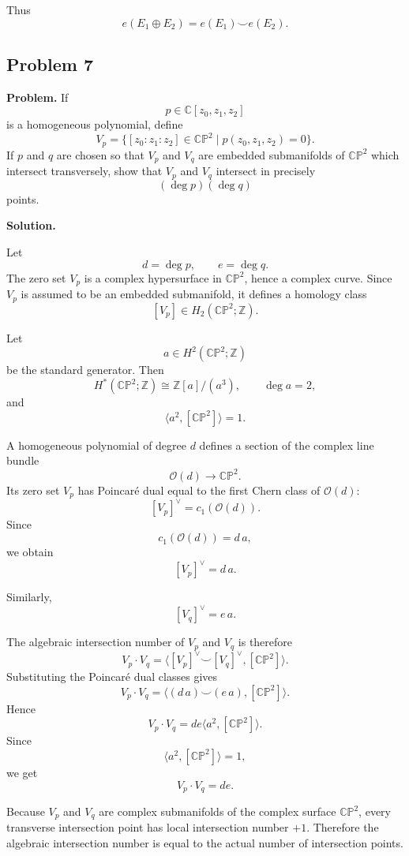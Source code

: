 \documentclass[12pt,a4paper]{article}
\theoremstyle{notespace}
\begin{document}
Thus
\[
\boxed{
	e(E_1\oplus E_2)=e(E_1)\smile e(E_2).
}
\]

\subsection{Problem 7}

\textbf{Problem.}
If
\[
p\in \mathbb C[z_0,z_1,z_2]
\]
is a homogeneous polynomial, define
\[
V_p
=
\{[z_0:z_1:z_2]\in \mathbb{CP}^2
\mid
p(z_0,z_1,z_2)=0\}.
\]
If \(p\) and \(q\) are chosen so that \(V_p\) and \(V_q\) are embedded
submanifolds of \(\mathbb{CP}^2\) which intersect transversely, show that
\(V_p\) and \(V_q\) intersect in precisely
\[
(\deg p)(\deg q)
\]
points.

\medskip

\noindent\textbf{Solution.}

Let
\[
d=\deg p,
\qquad
e=\deg q.
\]
The zero set \(V_p\) is a complex hypersurface in \(\mathbb{CP}^2\), hence a
complex curve. Since \(V_p\) is assumed to be an embedded submanifold, it defines
a homology class
\[
[V_p]\in H_2(\mathbb{CP}^2;\mathbb Z).
\]

Let
\[
a\in H^2(\mathbb{CP}^2;\mathbb Z)
\]
be the standard generator. Then
\[
H^*(\mathbb{CP}^2;\mathbb Z)
\cong
\mathbb Z[a]/(a^3),
\qquad
\deg a=2,
\]
and
\[
\langle a^2,[\mathbb{CP}^2]\rangle=1.
\]

A homogeneous polynomial of degree \(d\) defines a section of the complex line
bundle
\[
\mathcal O(d)\to \mathbb{CP}^2.
\]
Its zero set \(V_p\) has Poincar\'e dual equal to the first Chern class of
\(\mathcal O(d)\):
\[
[V_p]^\vee
=
c_1(\mathcal O(d)).
\]
Since
\[
c_1(\mathcal O(d))=d\,a,
\]
we obtain
\[
[V_p]^\vee=d\,a.
\]

Similarly,
\[
[V_q]^\vee=e\,a.
\]

The algebraic intersection number of \(V_p\) and \(V_q\) is therefore
\[
V_p\cdot V_q
=
\langle [V_p]^\vee\smile [V_q]^\vee,[\mathbb{CP}^2]\rangle.
\]
Substituting the Poincar\'e dual classes gives
\[
V_p\cdot V_q
=
\langle (d\,a)\smile(e\,a),[\mathbb{CP}^2]\rangle.
\]
Hence
\[
V_p\cdot V_q
=
de\langle a^2,[\mathbb{CP}^2]\rangle.
\]
Since
\[
\langle a^2,[\mathbb{CP}^2]\rangle=1,
\]
we get
\[
V_p\cdot V_q=de.
\]

Because \(V_p\) and \(V_q\) are complex submanifolds of the complex surface
\(\mathbb{CP}^2\), every transverse intersection point has local intersection
number \(+1\). Therefore the algebraic intersection number is equal to the actual
number of intersection points.
\end{document}
